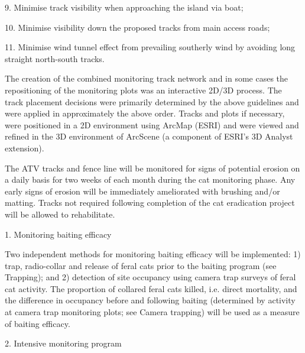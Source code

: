 \documentclass[version=last,
    paper=a4,                               %
    10pt,                                   %
    dvipsnames,
    oneside,                              %
    headings=openany,                       %
    open=any,
    BCOR=7mm,                               %
    DIV=15,     %
]{scrbook}
\begin{document}
9. Minimise track visibility when approaching the island via boat;

10. Minimise visibility down the proposed tracks from main access roads;

11. Minimise wind tunnel effect from prevailing southerly wind by
avoiding long straight north-south tracks.

The creation of the combined monitoring track network and in some cases
the repositioning of the monitoring plots was an interactive 2D/3D
process. The track placement decisions were primarily determined by the
above guidelines and were applied in approximately the above order.
Tracks and plots if necessary, were positioned in a 2D environment using
ArcMap (ESRI) and were viewed and refined in the 3D environment of
ArcScene (a component of ESRI's 3D Analyst extension).

The ATV tracks and fence line will be monitored for signs of potential
erosion on a daily basis for two weeks of each month during the cat
monitoring phase. Any early signs of erosion will be immediately
ameliorated with brushing and/or matting. Tracks not required following
completion of the cat eradication project will be allowed to
rehabilitate.

1. Monitoring baiting efficacy

Two independent methods for monitoring baiting efficacy will be
implemented: 1) trap, radio-collar and release of feral cats prior to
the baiting program (see Trapping); and 2) detection of site occupancy
using camera trap surveys of feral cat activity. The proportion of
collared feral cats killed, i.e. direct mortality, and the difference in
occupancy before and following baiting (determined by activity at camera
trap monitoring plots; see Camera trapping) will be used as a measure of
baiting efficacy.

2. Intensive monitoring program
\end{document}
